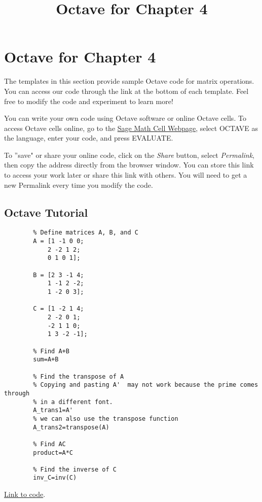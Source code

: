 \documentclass{ximera}
\title{Octave for Chapter 4} \license{CC BY-NC-SA 4.0}
\begin{document}
\begin{abstract}
\end{abstract}
\maketitle

\section*{Octave for Chapter 4}
The templates in this section provide sample Octave code for matrix operations. You can access our code through the link at the bottom of each template.  Feel free to modify the code and experiment to learn more!  

You can write your own code using Octave software or online Octave cells.  To access Octave cells online, go to the \href{https://sagecell.sagemath.org/}{Sage Math Cell Webpage}, select OCTAVE as the language, enter your code, and press EVALUATE.  

To ''save" or share your online code, click on the \emph{Share} button, select \emph{Permalink}, then copy the address directly from the browser window.  You can store this link to access your work later or share this link with others.  You will need to get a new Permalink every time you modify the code.

\subsection*{Octave Tutorial}

\begin{template}\label{temp:matrixOps}

    \begin{verbatim}
        % Define matrices A, B, and C
        A = [1 -1 0 0;
            2 -2 1 2;
            0 1 0 1];
            
        B = [2 3 -1 4;
            1 -1 2 -2;
            1 -2 0 3];   
            
        C = [1 -2 1 4;
            2 -2 0 1;
            -2 1 1 0;
            1 3 -2 -1];     
            
        % Find A+B
        sum=A+B
        
        % Find the transpose of A
        % Copying and pasting A'  may not work because the prime comes through
        % in a different font.
        A_trans1=A'
        % we can also use the transpose function
        A_trans2=transpose(A)
        
        % Find AC
        product=A*C
        
        % Find the inverse of C
        inv_C=inv(C)
    \end{verbatim}
    
    \href{https://sagecell.sagemath.org/?z=eJxdUMGOwiAUvDfpP8zFqLuaFPRmOFCMP2GMIZVmSVYwhe7-vg-0tcqBMDNv3rzHDHvTWmdw1bGzjQmQK9QraHeBKgsJgSPDmqFCtSsLpMOx5mDgA66QZHYacFnUycaxScbtQOc2yTshOBk3p102Pb3qGZkitm-RlDHgrLLXSCxlURHLvSbdZjhYWkV-12UR-qvIj5GOPwax0y7cfDDwLSStfM4ME3Ke6v4NGu2gf4NHT0XvlrZ3TbTejTYuRnEhl5MoSb956_ylb6KQX-pjCOv-TPcYgSRCZyXoXqjlHXo6X7Q=&lang=octave&interacts=eJyLjgUAARUAuQ==}{Link to code}.
    \end{template}
    
\end{document}
